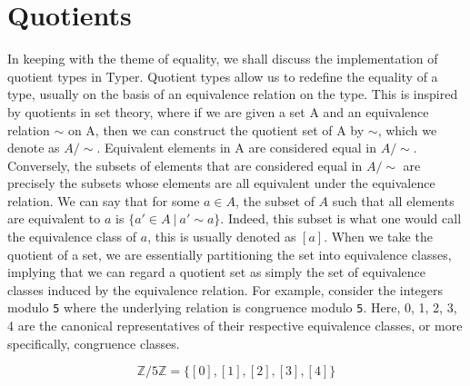 \documentclass[12pt,twoside,maitrise]{dms}
\theoremstyle{definition}
\numberwithin{equation}{section}
\numberwithin{table}{chapter}
\numberwithin{figure}{chapter}
\newcommand\id[1] {\texttt{#1}}
\begin{document}
\section{Quotients}

In keeping with the theme of equality, we shall discuss the implementation of
quotient types in Typer. Quotient types allow us to redefine the equality of a
type, usually on the basis of an equivalence relation on the type. This is
inspired by quotients in set theory, where if we are given a set A and an
equivalence relation $\sim$ on A, then we can construct the quotient set of A by
$\sim$, which we denote as $A / \sim$. Equivalent elements in A are considered
equal in $A / \sim$. Conversely, the subsets of elements that are considered
equal in $A / \sim$ are precisely the subsets whose elements are all equivalent
under the equivalence relation. We can say that for some $a \in A$, the subset
of $A$ such that all elements are equivalent to $a$ is $\{a' \in A \ | \ a' \sim
a \}$. Indeed, this subset is what one would call the equivalence class of $a$,
this is usually denoted as $[a]$. When we take the quotient of a set, we are
essentially partitioning the set into equivalence classes, implying that we can
regard a quotient set as simply the set of equivalence classes induced by the
equivalence relation. For example, consider the integers modulo \id{5} where the
underlying relation is congruence modulo \id{5}. Here, 0, 1, 2, 3, 4 are the
canonical representatives of their respective equivalence classes, or more
specifically, congruence classes.

\begin{equation}
\mathbb{Z} / 5\mathbb{Z} = \{ [0], [1], [2], [3], [4] \}
\end{equation}

\end{document}
